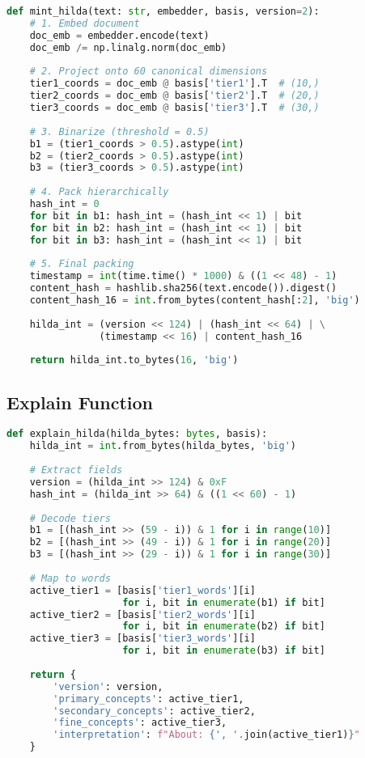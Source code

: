 \documentclass[11pt]{article}
\begin{document}
\begin{lstlisting}[language=Python, caption=HILDA Minting]
def mint_hilda(text: str, embedder, basis, version=2):
    # 1. Embed document
    doc_emb = embedder.encode(text)
    doc_emb /= np.linalg.norm(doc_emb)
    
    # 2. Project onto 60 canonical dimensions
    tier1_coords = doc_emb @ basis['tier1'].T  # (10,)
    tier2_coords = doc_emb @ basis['tier2'].T  # (20,)
    tier3_coords = doc_emb @ basis['tier3'].T  # (30,)
    
    # 3. Binarize (threshold = 0.5)
    b1 = (tier1_coords > 0.5).astype(int)
    b2 = (tier2_coords > 0.5).astype(int)
    b3 = (tier3_coords > 0.5).astype(int)
    
    # 4. Pack hierarchically
    hash_int = 0
    for bit in b1: hash_int = (hash_int << 1) | bit
    for bit in b2: hash_int = (hash_int << 1) | bit
    for bit in b3: hash_int = (hash_int << 1) | bit
    
    # 5. Final packing
    timestamp = int(time.time() * 1000) & ((1 << 48) - 1)
    content_hash = hashlib.sha256(text.encode()).digest()
    content_hash_16 = int.from_bytes(content_hash[:2], 'big')
    
    hilda_int = (version << 124) | (hash_int << 64) | \
                (timestamp << 16) | content_hash_16
    
    return hilda_int.to_bytes(16, 'big')
\end{lstlisting}

\subsection{Explain Function}

\begin{lstlisting}[language=Python, caption=HILDA Interpretation]
def explain_hilda(hilda_bytes: bytes, basis):
    hilda_int = int.from_bytes(hilda_bytes, 'big')
    
    # Extract fields
    version = (hilda_int >> 124) & 0xF
    hash_int = (hilda_int >> 64) & ((1 << 60) - 1)
    
    # Decode tiers
    b1 = [(hash_int >> (59 - i)) & 1 for i in range(10)]
    b2 = [(hash_int >> (49 - i)) & 1 for i in range(20)]
    b3 = [(hash_int >> (29 - i)) & 1 for i in range(30)]
    
    # Map to words
    active_tier1 = [basis['tier1_words'][i] 
                    for i, bit in enumerate(b1) if bit]
    active_tier2 = [basis['tier2_words'][i] 
                    for i, bit in enumerate(b2) if bit]
    active_tier3 = [basis['tier3_words'][i] 
                    for i, bit in enumerate(b3) if bit]
    
    return {
        'version': version,
        'primary_concepts': active_tier1,
        'secondary_concepts': active_tier2,
        'fine_concepts': active_tier3,
        'interpretation': f"About: {', '.join(active_tier1)}"
    }
\end{lstlisting}
\end{document}
